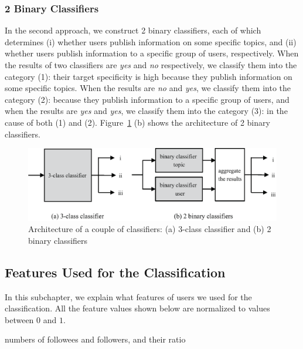 \subsubsection{2 Binary Classifiers}
\label{subsubsec:2-binary}

In the second approach, we construct 2 binary classifiers, each of
which determines (i) whether users publish information on some specific
topics, and (ii) whether users publish information to a specific group
of users, respectively.  When the results of two
classifiers are \emph{yes} and \emph{no} respectively, we classify them
into the category (1): their target specificity is high because they
publish information on some specific topics.  When the results are
\emph{no} and
\emph{yes}, we classify them into the category (2): because they publish
information to a specific group of users, and when the results
are \emph{yes}
and \emph{yes}, we classify them into the category (3): in the cause of
both (1) and (2).  Figure~\ref{fig:classifier} (b) shows the architecture of
2 binary classifiers.

{\footnotesize
\begin{figure}[t]
\begin{center}
\includegraphics[width=14cm]{images/classifier.eps}
 \caption{Architecture of a couple of classifiers: (a) 3-class
 classifier and (b) 2 binary classifiers}
\label{fig:classifier}
\end{center}
\end{figure}
}

\subsection{Features Used for the Classification}
\label{subsec:Features}

In this subchapter, we explain what features of users we used for the
classification.  All the feature values shown below are normalized to
values between $0$ and $1$.

\begin{description}
\bf {\item[(i)] numbers of followees and followers, and their ratio}
\end{description}

